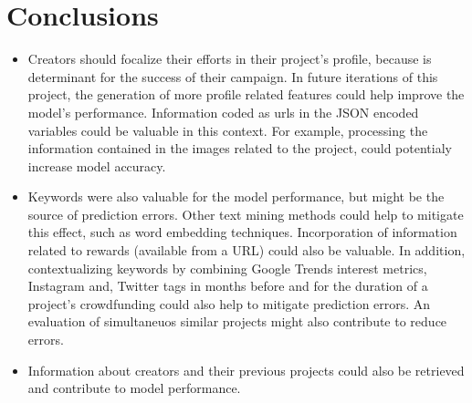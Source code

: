 \documentclass{article}
\begin{document}
\section{Conclusions}
\label{sec:conclu}
\begin{itemize}

\item Creators should focalize their efforts in their project's profile, because is determinant for the success of their campaign. In future iterations of this project, the generation of more profile related features could help improve the model's performance. Information coded as urls in the JSON encoded variables could be valuable in this context. For example, processing the information contained in the images related to the project, could potentialy increase model accuracy.

\item Keywords were also valuable for the model performance, but might be the source of prediction errors. Other text mining methods could help to mitigate this effect, such as word embedding techniques. Incorporation of information related to rewards (available from a URL) could also be valuable. In addition, contextualizing keywords by combining Google Trends interest metrics, Instagram and, Twitter tags in months before and for the duration of a project's crowdfunding could also help to mitigate prediction errors. An evaluation of simultaneuos similar projects might also contribute to reduce errors.

\item Information about creators and their previous projects could also be retrieved and contribute to model performance. 

\end{itemize}


\end{document}
